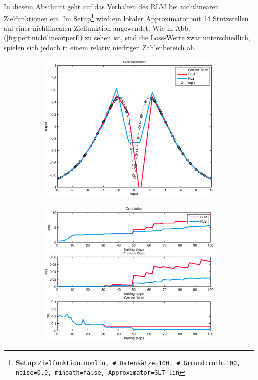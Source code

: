 \documentclass[a4paper, 12pt]{article}
\begin{document}
{In diesem Abschnitt geht auf das Verhalten des RLM bei nichtlinearen Zielfunktionen ein.
Im Setup\footnote{\textbf{Setup}:\quad\texttt{Zielfunktion=nonlin, \# Datensätze=100, \# Groundtruth=100, noise=0.0, minpath=false, Approximator=GLT lin}} wird ein lokaler Approximator mit 14 Stützstellen auf einer nichtlinearen Zielfunktion angewendet. Wie in Abb. (\ref{fig:perf:nichtlinear:perf}) zu sehen ist, sind die Loss-Werte zwar unterschiedlich, spielen sich jedoch in einem relativ niedrigen Zahlenbereich ab.
\begin{figure}[H]
        \centering
        \begin{subfigure}[b]{0.4\textwidth}
                \centering
                \includegraphics[width=\textwidth]{./images/copyofstats/nonlin14_approx_100GLT.eps}
                \caption{}
                \label{fig:perf:nichtlinear:approx}
        \end{subfigure}
        \begin{subfigure}[b]{0.4\textwidth}
                \centering
                \includegraphics[width=\textwidth]{./images/copyofstats/nonlin14_perf_100GLT.eps}

\end{subfigure}
\end{figure}}
\end{document}
